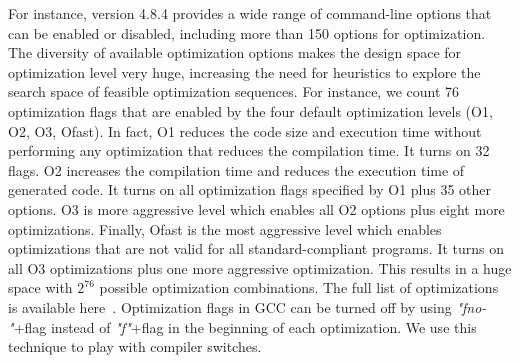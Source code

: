 For instance, version 4.8.4 provides a wide range of command-line options that can be enabled or disabled, including more than 150 options for optimization. The diversity of available optimization options makes the design space for optimization level very huge, increasing the need for heuristics to explore the search space of feasible optimization sequences.
For instance, we count 76 optimization flags that are enabled by the four default optimization levels (O1, O2, O3, Ofast). 
In fact, O1 reduces the code size and execution time without performing any optimization that reduces the compilation time. It turns on 32 flags. 
O2 increases the compilation time and reduces the execution time of generated code. It turns on all optimization flags specified by O1 plus 35 other options. 
O3 is more aggressive level which enables all O2 options plus eight more optimizations. 
Finally, Ofast is the most aggressive level which enables optimizations that are not valid for all standard-compliant programs. It turns on all O3 optimizations plus one more aggressive optimization. 
This results in a huge space with $2^{76}$ possible optimization combinations. The full list of optimizations is available here~\cite{mboussaa}.
Optimization flags in GCC can be turned off by using \textit{"fno-"}+flag instead of \textit{"f"}+flag in the beginning of each optimization. 
We use this technique to play with compiler switches.

